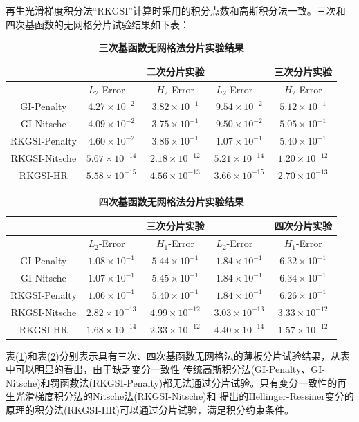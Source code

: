 再生光滑梯度积分法“RKGSI”计算时采用的积分点数和高斯积分法一致。三次和四次基函数的无网格分片试验结果如下表：
\begin{table}[h]\label{cubic}
    \caption{\textbf{三次基函数无网格法分片实验结果}}
    \centering
   \begin{tabular}{ccccc}
   \toprule
   &$\quad$ &二次分片实验 &$\quad$ &三次分片实验\\
   \midrule
   &$L_2$-Error$\quad$&$H_2$-Error&$L_2$-Error$\quad$&$H_2$-Error\\
   \midrule
   GI-Penalty&$4.27\times10^{-2}$&$3.82\times10^{-1}$&$9.54\times10^{-2}$&$5.12\times10^{-1}$\\
   GI-Nitsche&$4.09\times10^{-2}$&$3.75\times10^{-1}$&$9.50\times10^{-2}$&$5.05\times10^{-1}$\\
  RKGSI-Penalty&$4.60\times10^{-2}$&$3.86\times10^{-1}$&$1.07\times10^{-1}$&$5.40\times10^{-1}$\\
  RKGSI-Nitsche&$5.67\times10^{-14}$&$2.18\times10^{-12}$&$5.21\times10^{-14}$&$1.20\times10^{-12}$\\
  RKGSI-HR&$5.58\times10^{-15}$&$4.56\times10^{-13}$&$3.66\times10^{-15}$&$2.70\times10^{-13}$\\
   \bottomrule
   \end{tabular}
   \end{table}
   \begin{table}[h]\label{quartic}
    \caption{\textbf{四次基函数无网格法分片实验结果}}
    \centering
   \begin{tabular}{ccccc}
   \toprule
   &$\quad$ &三次分片实验 &$\quad$ &四次分片实验\\
   \midrule
   &$L_2$-Error$\quad$&$H_1$-Error&$L_2$-Error$\quad$&$H_1$-Error\\
   \midrule
   GI-Penalty&$1.08\times10^{-1}$&$5.44\times10^{-1}$&$1.84\times10^{-1}$&$6.32\times10^{-1}$\\
   GI-Nitsche&$1.07\times10^{-1}$&$5.45\times10^{-1}$&$1.84\times10^{-1}$&$6.34\times10^{-1}$\\
  RKGSI-Penalty&$1.06\times10^{-1}$&$5.40\times10^{-1}$&$1.84\times10^{-1}$&$6.26\times10^{-1}$\\
  RKGSI-Nitsche&$2.82\times10^{-13}$&$4.99\times10^{-12}$&$3.03\times10^{-13}$&$3.33\times10^{-12}$\\
  RKGSI-HR&$1.68\times10^{-14}$&$2.33\times10^{-12}$&$4.40\times10^{-14}$&$1.57\times10^{-12}$\\
\bottomrule
\end{tabular}
\end{table}\par
表(\ref{cubic})和表(\ref{quartic})分别表示具有三次、四次基函数无网格法的薄板分片试验结果，从表中可以明显的看出，由于缺乏变分一致性
传统高斯积分法(GI-Penalty、GI-Nitsche)和罚函数法(RKGSI-Penalty)都无法通过分片试验。只有变分一致性的再生光滑梯度积分法的Nitsche法(RKGSI-Nitsche)和
提出的Hellinger-Ressiner变分的原理的积分法(RKGSI-HR)可以通过分片试验，满足积分约束条件。
